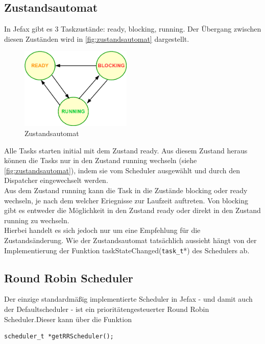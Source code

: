 \documentclass[fontsize=12pt, toc=bibliography, notitlepage]{scrreprt}
\begin{document}
\subsection{Zustandsautomat}
\label{subsec:zustandsautomat}
In Jefax gibt es 3 Taskzustände: ready, blocking, running. Der Übergang zwischen diesen Zuständen wird in \autoref{fig:zustandsautomat} dargestellt.

\begin{figure}[H]
	\centering
	\includegraphics[width=200px]{images/Zustandsautomat.png}
	\caption{Zustandsautomat}
	\label{fig:zustandsautomat}
\end{figure}

Alle Tasks starten initial mit dem Zustand ready. Aus diesem Zustand heraus können die Tasks nur in den Zustand running wechseln (siehe \autoref{fig:zustandsautomat}), indem sie vom Scheduler ausgewählt und durch den Dispatcher eingewechselt werden.\\

Aus dem Zustand running kann die Task in die Zustände blocking oder ready wechseln, je nach dem welcher Eriegnisse zur Laufzeit auftreten. Von blocking gibt es entweder die Möglichkeit in den Zustand ready oder direkt in den Zustand running zu wechseln.\\

Hierbei handelt es sich jedoch nur um eine Empfehlung für die Zustandsänderung. Wie der Zustandsautomat tatsächlich aussieht hängt von der Implementierung der Funktion taskStateChanged(\verb|task_t|*) des Schedulers ab.

\subsection{Round Robin Scheduler}
\label{subsec:round-robin-scheduler}
Der einzige standardmäßig implementierte Scheduler in Jefax - und damit auch der Defaultscheduler - ist ein prioritätengesteuerter Round Robin Scheduler.Dieser kann über die Funktion

\begin{lstlisting}
scheduler_t *getRRScheduler();
\end{lstlisting}
\end{document}
